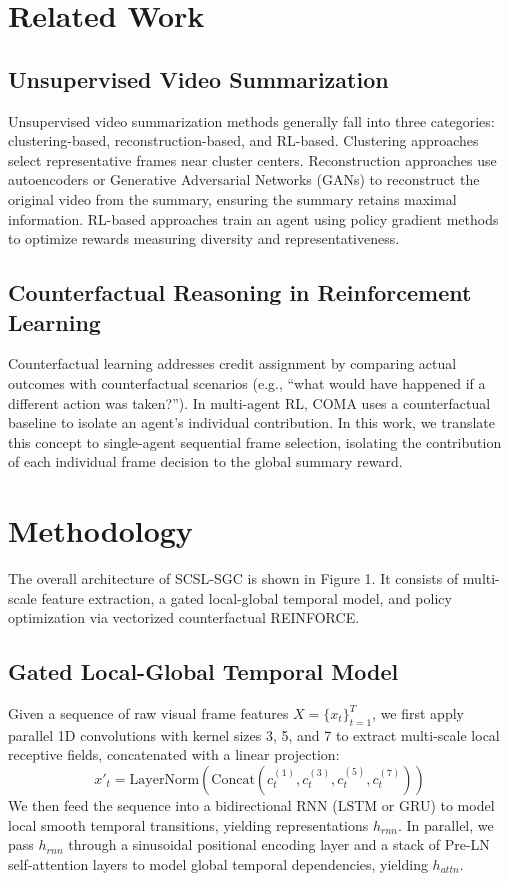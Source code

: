 \documentclass[letterpaper]{article} %
\begin{document}
\section{Related Work}
\subsection{Unsupervised Video Summarization}
Unsupervised video summarization methods generally fall into three categories: clustering-based, reconstruction-based, and RL-based. Clustering approaches select representative frames near cluster centers. Reconstruction approaches use autoencoders or Generative Adversarial Networks (GANs) to reconstruct the original video from the summary, ensuring the summary retains maximal information. RL-based approaches \cite{zhou2018deep} train an agent using policy gradient methods to optimize rewards measuring diversity and representativeness. 

\subsection{Counterfactual Reasoning in Reinforcement Learning}
Counterfactual learning addresses credit assignment by comparing actual outcomes with counterfactual scenarios (e.g., ``what would have happened if a different action was taken?''). In multi-agent RL, COMA \cite{foerster2018counterfactual} uses a counterfactual baseline to isolate an agent's individual contribution. In this work, we translate this concept to single-agent sequential frame selection, isolating the contribution of each individual frame decision to the global summary reward.

\section{Methodology}
The overall architecture of SCSL-SGC is shown in Figure 1. It consists of multi-scale feature extraction, a gated local-global temporal model, and policy optimization via vectorized counterfactual REINFORCE.

\subsection{Gated Local-Global Temporal Model}
Given a sequence of raw visual frame features $X = \{x_t\}_{t=1}^T$, we first apply parallel 1D convolutions with kernel sizes 3, 5, and 7 to extract multi-scale local receptive fields, concatenated with a linear projection:
\begin{equation}
    x'_t = \text{LayerNorm}(\text{Concat}(c^{(1)}_t, c^{(3)}_t, c^{(5)}_t, c^{(7)}_t))
\end{equation}
We then feed the sequence into a bidirectional RNN (LSTM or GRU) to model local smooth temporal transitions, yielding representations $h_{rnn}$. In parallel, we pass $h_{rnn}$ through a sinusoidal positional encoding layer and a stack of Pre-LN self-attention layers to model global temporal dependencies, yielding $h_{attn}$.
\end{document}
